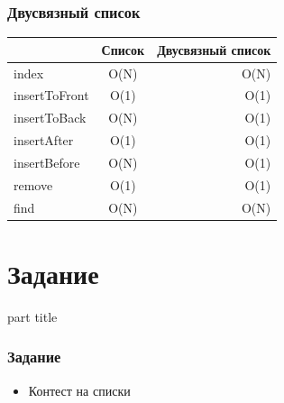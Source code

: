 \documentclass[14pt,pdf,hyperref={unicode}]{beamer}
\begin{document}
\begin{frame}[fragile]
\frametitle{Двусвязный список}
\begin{center}
  \begin{tabular}{  l | c r }
      & Список & Двусвязный список \\
    \hline
    index & O(N) &  O(N) \\
    insertToFront & O(1) & O(1) \\
    insertToBack & O(N) & O(1) \\
    insertAfter & O(1) & O(1) \\
    insertBefore & O(N) & O(1) \\
    remove & O(1) & O(1) \\
    find & O(N) & O(N) \\
    \hline
  \end{tabular}
\end{center}
\end{frame}




\section{Задание}
\begin{frame}
\begin{center}
\begin{beamercolorbox}[sep=8pt,center]{part
title}
\insertsection
\end{beamercolorbox}
\end{center}
\end{frame}

\begin{frame}[fragile]
\frametitle{Задание} 
\begin{itemize}
\item Контест на списки
\end{itemize}
\end{frame}
\end{document}
